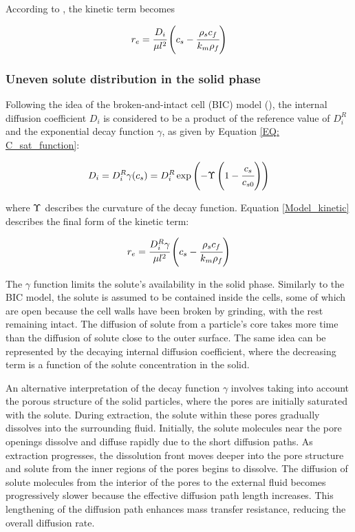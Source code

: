 \documentclass[a4paper,fleqn]{cas-dc}
\begin{document}
		According to \citet{Reverchon1996}, the kinetic term becomes
		
		{\footnotesize
			\begin{equation}
				\label{Model_kinetic_no_sat}
				r_e = \cfrac{D_i}{ \mu l^2 } \left(c_s - \cfrac{\rho_s c_f}{k_m \rho_f} \right)
		\end{equation} }
		
		\subsubsection{Uneven solute distribution in the solid phase} \label{CH: Gamma_Function}
		
		Following the idea of the broken-and-intact cell (BIC) model (\citet{Sovova2017}), the internal diffusion coefficient $D_i$ is considered to be a product of the reference value of $D_i^R$ and the exponential decay function $\gamma$, as given by Equation \ref{EQ: C_sat_function}:
		
		{\footnotesize
			\begin{equation}
				D_i = D_i^R \gamma(c_s) = D_i^R \exp \left( - \Upsilon \left( 1-\cfrac{ c_s }{c_{s0}} \right) \right) \label{EQ: C_sat_function}
		\end{equation} }
		
		where  ${\color{black}\Upsilon}$ describes the curvature of the decay function. Equation \ref{Model_kinetic} describes the final form of the kinetic term:
		
		{\footnotesize
			\begin{equation}
				\label{Model_kinetic}
				r_e = \cfrac{D_i^R \gamma }{ \mu l^2 } \left( c_s  - \cfrac{\rho_s c_f }{ k_m \rho_f }  \right)
		\end{equation} }
		
		The $\gamma$ function limits the solute's availability in the solid phase. Similarly to the BIC model, the solute is assumed to be contained inside the cells, some of which are open because the cell walls have been broken by grinding, with the rest remaining intact. The diffusion of solute from a particle's core takes more time than the diffusion of solute close to the outer surface. The same idea can be represented by the decaying internal diffusion coefficient, where the decreasing term is a function of the solute concentration in the solid. 
		
		An alternative interpretation of the decay function $\gamma$ involves taking into account the porous structure of the solid particles, where the pores are initially saturated with the solute. During extraction, the solute within these pores gradually dissolves into the surrounding fluid. Initially, the solute molecules near the pore openings dissolve and diffuse rapidly due to the short diffusion paths. As extraction progresses, the dissolution front moves deeper into the pore structure and solute from the inner regions of the pores begins to dissolve. The diffusion of solute molecules from the interior of the pores to the external fluid becomes progressively slower because the effective diffusion path length increases. This lengthening of the diffusion path enhances mass transfer resistance, reducing the overall diffusion rate. 
		
\end{document}
